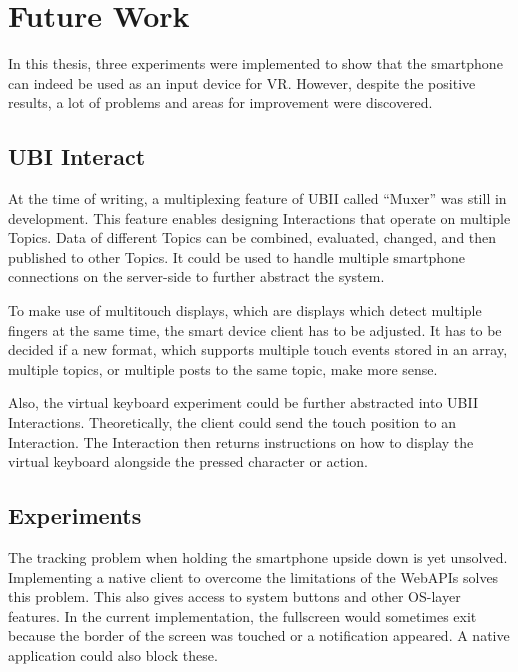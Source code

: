 \chapter{Future Work}\label{chapter:future-work}

In this thesis, three experiments were implemented to show that the smartphone can indeed be used as an input device for \gls{VR}. However, despite the positive results, a lot of problems and areas for improvement were discovered. %


\section{UBI Interact}\label{section:fw-ubii}

At the time of writing, a multiplexing feature of \gls{UBII} called \enquote{Muxer} was still in development. This feature enables designing Interactions that operate on multiple Topics. Data of different Topics can be combined, evaluated, changed, and then published to other Topics. It could be used to handle multiple smartphone connections on the server-side to further abstract the system.

To make use of multitouch displays, which are displays which detect multiple fingers at the same time, the smart device client has to be adjusted. It has to be decided if a new format, which supports multiple touch events stored in an array, multiple topics, or multiple posts to the same topic, make more sense.

Also, the virtual keyboard experiment could be further abstracted into \gls{UBII} Interactions. Theoretically, the client could send the touch position to an Interaction. The Interaction then returns instructions on how to display the virtual keyboard alongside the pressed character or action.


\section{Experiments}\label{section:fw-experiments}

The tracking problem when holding the smartphone upside down is yet unsolved. Implementing a native client to overcome the limitations of the Web\glspl{API} solves this problem. This also gives access to system buttons and other \gls{OS}-layer features. In the current implementation, the fullscreen would sometimes exit because the border of the screen was touched or a notification appeared. A native application could also block these.

